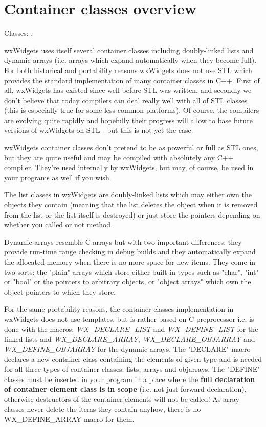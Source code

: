 \section{Container classes overview}\label{wxcontaineroverview}

Classes: , 

wxWidgets uses itself several container classes including doubly-linked lists
and dynamic arrays (i.e. arrays which expand automatically when they become
full). For both historical and portability reasons wxWidgets does not
use STL which provides the standard implementation of many container classes in
C++. First of all, wxWidgets has existed since well before STL was written, and
secondly we don't believe that today compilers can deal really well with all of
STL classes (this is especially true for some less common platforms). Of
course, the compilers are evolving quite rapidly and hopefully their progress
will allow to base future versions of wxWidgets on STL - but this is not yet
the case.

wxWidgets container classes don't pretend to be as powerful or full as STL
ones, but they are quite useful and may be compiled with absolutely any C++
compiler. They're used internally by wxWidgets, but may, of course, be used in
your programs as well if you wish.

The list classes in wxWidgets are doubly-linked lists which may either own the
objects they contain (meaning that the list deletes the object when it is
removed from the list or the list itself is destroyed) or just store the
pointers depending on whether you called or not 
 method.

Dynamic arrays resemble C arrays but with two important differences: they
provide run-time range checking in debug builds and they automatically expand
the allocated memory when there is no more space for new items. They come in
two sorts: the "plain" arrays which store either built-in types such as "char",
"int" or "bool" or the pointers to arbitrary objects, or "object arrays" which
own the object pointers to which they store.

For the same portability reasons, the container classes implementation in wxWidgets
does not use templates, but is rather based on C preprocessor i.e. is done with
the macros: {\it WX\_DECLARE\_LIST} and {\it WX\_DEFINE\_LIST} for the linked
lists and {\it WX\_DECLARE\_ARRAY}, {\it WX\_DECLARE\_OBJARRAY} and {\it WX\_DEFINE\_OBJARRAY} for
the dynamic arrays. The "DECLARE" macro declares a
new container class containing the elements of given type and is needed for all
three types of container classes: lists, arrays and objarrays. The "DEFINE"
classes must be inserted in your program in a place where the {\bf full
declaration of container element class is in scope} (i.e. not just forward
declaration), otherwise destructors of the container elements will not be
called! As array classes never delete the items they contain anyhow, there is
no WX\_DEFINE\_ARRAY macro for them.

